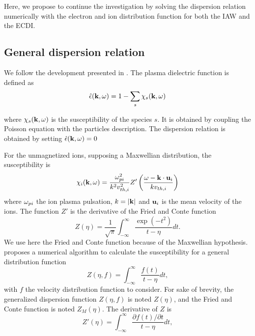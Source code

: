   Here, we propose to continue the investigation by solving the dispersion relation numerically with the electron and ion distribution function for both the \ac{IAW} and the \ac{ECDI}.
  
  
  \subsection{General dispersion relation}
    \label{sec-geneDR}
    
    We follow the development presented in \citet{ducrocq2006,cavalier2013,lafleur2016}.
    The plasma dielectric function is defined as
    \begin{equation} \label{eq-de}
      \hat\epsilon({\mathbf k},\omega) = 1 - \sum_s \chi_s({\mathbf k},\omega)
    \end{equation}
    
    where $\chi_s({\mathbf k}, \omega)$ is the susceptibility of the species $s$.
    It is obtained by coupling the Poisson equation with the particles description.
    The dispersion relation is obtained by setting $  \hat\epsilon({\mathbf k},\omega) =0$
    
    
    For the unmagnetized ions, supposing a Maxwellian distribution, the susceptibility is
    \begin{equation} \label{eq-susceptibility}
      \chi_i({\mathbf k},\omega) = \frac{\omega_{pi}^2}{k^2 v^2_{th, i}} Z'\left( \frac{\omega - {\mathbf k} \cdot {\mathbf u_{i}}}{k v_{th, i}}  \right)
    \end{equation}
    where $\omega_{pi}$ the ion plasma pulsation, $k=\lvert{\mathbf k}\rvert$ and ${\mathbf u_i}$ is the mean velocity of the ions.
    The function $Z'$ is the derivative of the Fried and Conte function \citep{fried1961}
    \begin{equation} \label{eq-friedandConte}
      Z(\eta) = \frac{1}{\sqrt{\pi}} \int_{-\infty}^{\infty} \frac{\exp{(-t^2)}}{t - \eta} dt.
    \end{equation}
    We use here the Fried and Conte function because of the Maxwellian hypothesis.
    \citet{xie2013} proposes a numerical algorithm to calculate the susceptibility for a general distribution function
    \begin{equation} \label{eq-general}
      Z(\eta, f) = \int_{-\infty}^{\infty} \frac{f(t)}{t - \eta} dt,
    \end{equation}
    with $f$ the velocity distribution function to consider.
    For sake of brevity, the generalized dispersion function $Z(\eta,f)$ is noted $Z(\eta)$, and the Fried and Conte function is noted $Z_M(\eta)$.
    The derivative of $Z$ is
    \begin{equation} \label{eq-derivatives}
      Z'(\eta) = \int_{-\infty}^{\infty} \frac{\partial f(t) / \partial t}{t - \eta} dt,
    \end{equation}
    
